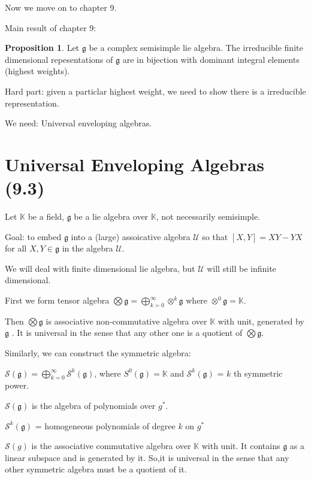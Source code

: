 \documentclass{article}
\theoremstyle{definition}
\newtheorem{proposition}{Proposition}
\begin{document}
Now we move on to chapter 9.

Main result of chapter 9:

\begin{proposition}
    Let \(\mathfrak{g}\) be a complex semisimple lie algebra. The irreducible finite dimensional repesentations of \(\mathfrak{g}\) are in bijection with dominant integral elements (highest weights).
\end{proposition}

Hard part: given a particlar highest weight, we need to show there is a irreducible representation.

We need: Universal enveloping algebras.

\section*{Universal Enveloping Algebras (9.3)}

Let \(\mathbb{K}\) be a field, \(\mathfrak{g} \) be a lie algebra over \(\mathbb{K}\), not necessarily semisimple.

Goal: to embed \(\mathfrak{g}\) into a (large) assoicative algebra \(\mathcal{U}\) so that \([X,Y] = XY - YX\) for all \(X,Y\in \mathfrak{g}\) in the algebra \(\mathcal{U}\).

We will deal with finite dimensional lie algebra, but \(\mathcal{U}\) will still be infinite dimensional.

First we form tensor algebra \(\bigotimes \mathfrak{g}= \bigoplus_{k=0}^{\infty} \otimes^k \mathfrak{g}\) where \(\otimes ^0 \mathfrak{g} = \mathbb{K} \).

Then \(\bigotimes \mathfrak{g} \) is associative non-commutative algebra over \(\mathbb{K}\) with unit, generated by \(\mathfrak{g} \) . It is universal in the sense that any other one is a quotient of \(\bigotimes \mathfrak{g}\).

Similarly, we can construct the symmetric algebra:

\(\mathcal{S} (\mathfrak{g} ) = \bigoplus_{k=0}^{\infty} \mathcal{S} ^k(\mathfrak{g} )\), where \(S^0(\mathfrak{g} ) = \mathbb{K} \) and \(\mathcal{S} ^k (\mathfrak{g} )\) = \(k\) th symmetric power.

\(\mathcal{S} (\mathfrak{g})\) is the algebra of polynomials over \(g^{\ast}\).

\(\mathcal{S} ^k(\mathfrak{g})\) = homogeneous polynomials of degree \(k\) on \(g^{\ast}\) 

\(\mathcal{S} (g)\) is the associative commutative algebra over \(\mathbb{K}\) with unit. It contains \(\mathfrak{g} \) as a linear subspace and is generated by it. So,it is universal in the sense that any other symmetric algebra must be a quotient of it.
\end{document}
